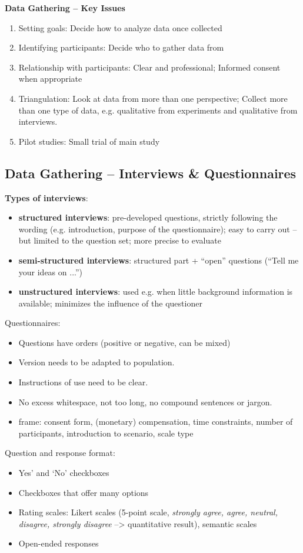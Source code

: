 \textbf{Data Gathering -- Key Issues}
\begin{enumerate}
\item Setting goals: Decide how to analyze data once collected
\item Identifying participants: Decide who to gather data from
\item Relationship with participants: Clear and professional; Informed consent when appropriate
\item Triangulation: Look at data from more than one perspective; Collect more than one type of data, e.g. qualitative from experiments and qualitative from interviews.
\item Pilot studies: Small trial of main study
\end{enumerate}
\subsection{Data Gathering -- Interviews \& Questionnaires}
\textbf{Types of interviews}:
\begin{itemize}
\item \textbf{structured interviews}: pre-developed questions, strictly following the wording (e.g. introduction, purpose of the questionnaire); easy to carry out – but limited to the question set; more precise to evaluate
\item \textbf{semi-structured interviews}: structured part + “open” questions (“Tell me your ideas on ...”)
\item \textbf{unstructured interviews}: used e.g. when little background information is available; minimizes the influence of the questioner
\end{itemize}
Questionnaires: 
\begin{itemize}
\item Questions have orders (positive or negative, can be mixed)
\item Version needs to be adapted to population.
\item Instructions of use need to be clear.
\item No excess whitespace, not too long, no compound sentences or jargon.
\item frame: consent form, (monetary) compensation, time constraints, number of participants, introduction to scenario, scale type
\end{itemize}
Question and response format:
\begin{itemize}
\item Yes’ and ‘No’ checkboxes
\item Checkboxes that offer many options
\item Rating scales: Likert scales (5-point scale, \textit{strongly agree, agree, neutral, disagree, strongly disagree} --> quantitative result), semantic scales
\item Open-ended responses
\end{itemize}
